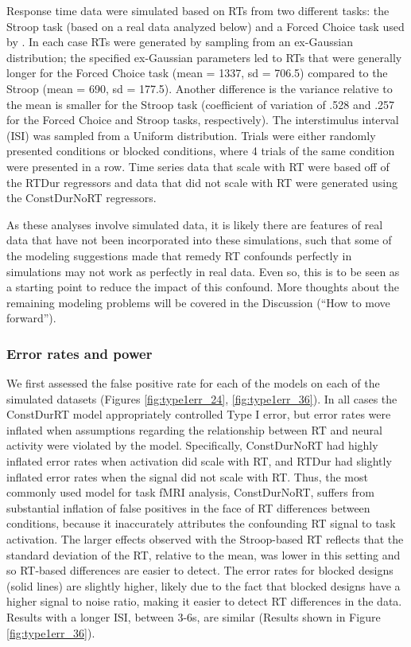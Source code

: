 \documentclass[titlepage,12pt] {article}
\begin{document}
Response time data were simulated based on RTs from two different tasks: the Stroop task (based on a real data analyzed below) and a Forced Choice task used by \citet{grinband_detection_2008}.  In each case RTs were generated by sampling from an ex-Gaussian distribution; the specified ex-Gaussian parameters led to RTs that were generally longer for the Forced Choice task (mean = 1337, sd = 706.5) compared to the Stroop (mean = 690, sd = 177.5).  Another difference is the variance relative to the mean is smaller for the Stroop task (coefficient of variation of .528 and .257 for the Forced Choice and Stroop tasks, respectively).   The interstimulus interval (ISI) was sampled from a Uniform distribution. Trials were either randomly presented conditions or blocked conditions, where 4 trials of the same condition were presented in a row.  Time series data that scale with RT were based off of the RTDur regressors and data that did not scale with RT were generated using the ConstDurNoRT regressors. 

As these analyses involve simulated data, it is likely there are features of real data that have not been incorporated into these simulations, such that some of the modeling suggestions made that remedy RT confounds perfectly in simulations may not work as perfectly in real data.  Even so, this is to be seen as a starting point to reduce the impact of this confound.  More thoughts about the remaining modeling problems will be covered in the Discussion (``How to move forward'').

\subsubsection*{Error rates and power}

We first assessed the false positive rate for each of the models on each of the simulated datasets (Figures \ref{fig:type1err_24}, \ref{fig:type1err_36}).  In all cases the ConstDurRT model appropriately controlled Type I error, but error rates were inflated when assumptions regarding the relationship between RT and neural activity were violated by the model.  Specifically, ConstDurNoRT had highly inflated error rates when activation did scale with RT, and RTDur had slightly inflated error rates when the signal did not  scale with RT.  Thus, the most commonly used model for task fMRI analysis, ConstDurNoRT, suffers from substantial inflation of false positives in the face of RT differences between conditions, because it inaccurately attributes the confounding RT signal to task activation.  The larger effects observed with the Stroop-based RT reflects that the standard deviation of the RT, relative to the mean, was lower in this setting and so RT-based differences are easier to detect. The error rates for blocked designs (solid lines) are slightly higher, likely due to the fact that blocked designs have a higher signal to noise ratio, making it easier to detect RT differences in the data.  Results with a longer ISI, between 3-6s, are similar (Results shown in Figure \ref{fig:type1err_36}).
\end{document}
